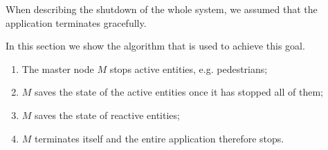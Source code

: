 When describing the shutdown of the whole system, we assumed that the
application terminates gracefully.

In this section we show the algorithm that is used to achieve this goal.

\begin{enumerate}
  \item The master node $M$ stops active entities, e.g. pedestrians;
  \item $M$ saves the state of the active entities once it has stopped all of
    them;
  \item $M$ saves the state of reactive entities;
  \item $M$ terminates itself and the entire application therefore stops.
\end{enumerate}
